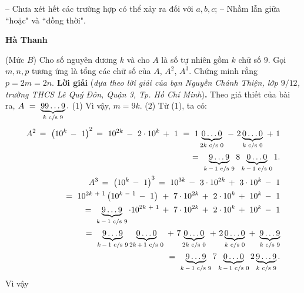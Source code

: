\begin{multicols}{2}
{	\vskip 0.05cm
	-- Chưa xét hết các trường hợp có thể xảy ra đối với $a, b, c$;
	\vskip 0.05cm
	-- Nhầm lẫn giữa ``hoặc" và ``đồng thời".
	\begin{flushright}
		\textbf{Hà Thanh}
	\end{flushright}
	{}
	(Mức $B$) Cho số nguyên dương $k$ và cho $A$ là số tự nhiên gồm $k$ chữ số $9$. Gọi $m, n, p$ tương ứng là tổng các chữ số của $A$, $A^2$, $A^3$. Chứng minh rằng $p = 2m = 2n$.
	\vskip 0.05cm
	\textbf{Lời giải} (\textit{dựa theo lời giải của bạn Nguyễn Chánh Thiện, lớp $9/12$, trường THCS Lê Quý Đôn, Quận 3, Tp. Hồ Chí Minh})\textbf{.}
	\vskip 0.05cm
	Theo giả thiết của bài ra, $A\,\, = \,\,\underbrace {99 \ldots 9}_{k\,\,{\rm{c/s}}\,\,9}.$ \hfill ($1$)
	\vskip 0.05cm
	Vì vậy, $m = 9k$. \hfill ($2$)
	\vskip 0.05cm
	Từ ($1$), ta có:
	\begin{align*}
			{A^2}\, = \,\,{\left( {{{10}^k}\, - \,\,1} \right)^2}\, = \,\,{10^{2k}}\, - \,\,2 \cdot {10^k}\, + \,\,1\,\, = \,\,1\underbrace {0 \ldots 0}_{2k\,\,{\rm{c/s}}\,\,0}\,\, - \,\,2\underbrace {0 \ldots 0}_{k\,\,{\rm{c/s}}\,\,0}\,\, + \,\,1\\
			\,\,\,\,\,\, = \,\,\underbrace {9 \ldots 9}_{k\, - \,1\,\,{\rm{c/s}}\,\,9}8\underbrace {0 \ldots 0}_{k\, - \,1\,\,{\rm{c/s}}\,\,0}1.\\
				{A^3}\, = \,\,{\left( {{{10}^k}\, - \,\,1} \right)^3}\, = \,\,{10^{3k}}\, - \,\,3 \cdot {10^{2k}}\, + \,\,3 \cdot {10^k}\, - \,\,1\\
				\,\,\,\,\,\, = \,\,{10^{2k\,\, + \,\,1}}\left( {{{10}^{k\,\, - \,\,1}}\, - \,\,1} \right)\,\, + \,\,7 \cdot {10^{2k}}\, + \,\,2 \cdot {10^k}\, + \,\,{10^k}\, - \,\,1\\
				\,\,\,\,\,\, = \,\,\underbrace {9 \ldots 9}_{k\, - \,1\,\,{\rm{c/s}}\,\,9} \cdot {10^{2k\,\, + \,\,1}}\, + \,\,7 \cdot {10^{2k}}\, + \,\,2 \cdot {10^k}\, + \,\,{10^k}\, - \,\,1\\
				\,\,\,\,\,\, = \,\,\underbrace {9 \ldots 9}_{k\, - \,1\,\,{\rm{c/s}}\,\,9}\underbrace {0 \ldots 0}_{2k\, + \,1\,\,{\rm{c/s}}\,\,0}\,\, + \,\,7\underbrace {0 \ldots 0}_{2k\,\,{\rm{c/s}}\,\,0}\,\, + \,\,2\underbrace {0 \ldots 0}_{k\,\,{\rm{c/s}}\,\,0}\,\, + \,\,\underbrace {9 \ldots 9}_{k\,\,{\rm{c/s}}\,\,9}\\
				\,\,\,\,\,\, = \,\,\underbrace {9 \ldots 9}_{k\, - \,1\,\,{\rm{c/s}}\,\,9}7\underbrace {0 \ldots 0}_{k\, - \,1\,\,{\rm{c/s}}\,\,0}2\underbrace {9 \ldots 9}_{k\,\,{\rm{c/s}}\,\,9}.
	\end{align*}
	Vì vậy
}
\end{multicols}
